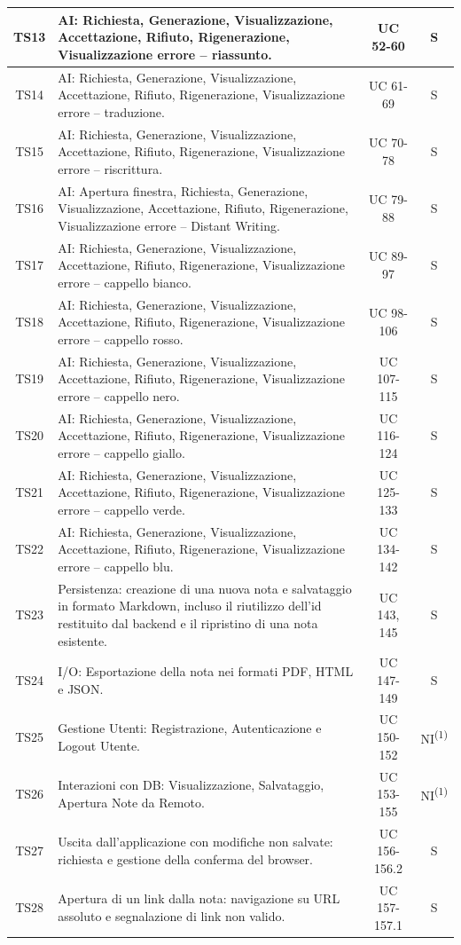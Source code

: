 \begin{xltabular}{\textwidth}{|c|X|c|c|}
    TS13 & AI: Richiesta, Generazione, Visualizzazione, Accettazione, Rifiuto, Rigenerazione, Visualizzazione errore -- riassunto. & UC 52-60 & S \\ \hline
    TS14 & AI: Richiesta, Generazione, Visualizzazione, Accettazione, Rifiuto, Rigenerazione, Visualizzazione errore -- traduzione. & UC 61-69 & S \\ \hline
    TS15 & AI: Richiesta, Generazione, Visualizzazione, Accettazione, Rifiuto, Rigenerazione, Visualizzazione errore -- riscrittura. & UC 70-78 & S \\ \hline
    TS16 & AI: Apertura finestra, Richiesta, Generazione, Visualizzazione, Accettazione, Rifiuto, Rigenerazione, Visualizzazione errore -- Distant Writing. & UC 79-88 & S \\ \hline
    TS17 & AI: Richiesta, Generazione, Visualizzazione, Accettazione, Rifiuto, Rigenerazione, Visualizzazione errore -- cappello bianco. & UC 89-97 & S \\ \hline
    TS18 & AI: Richiesta, Generazione, Visualizzazione, Accettazione, Rifiuto, Rigenerazione, Visualizzazione errore -- cappello rosso. & UC 98-106 & S \\ \hline
    TS19 & AI: Richiesta, Generazione, Visualizzazione, Accettazione, Rifiuto, Rigenerazione, Visualizzazione errore -- cappello nero. & UC 107-115 & S \\ \hline
    TS20 & AI: Richiesta, Generazione, Visualizzazione, Accettazione, Rifiuto, Rigenerazione, Visualizzazione errore -- cappello giallo. & UC 116-124 & S \\ \hline
    TS21 & AI: Richiesta, Generazione, Visualizzazione, Accettazione, Rifiuto, Rigenerazione, Visualizzazione errore -- cappello verde. & UC 125-133 & S \\ \hline
    TS22 & AI: Richiesta, Generazione, Visualizzazione, Accettazione, Rifiuto, Rigenerazione, Visualizzazione errore -- cappello blu. & UC 134-142 & S \\ \hline

    TS23 & Persistenza: creazione di una nuova nota e salvataggio in formato Markdown, incluso il riutilizzo dell'id restituito dal backend e il ripristino di una nota esistente. & UC 143, 145 & S \\ \hline
    TS24 & I/O: Esportazione della nota nei formati PDF, HTML e JSON. & UC 147-149 & S \\ \hline
    TS25 & Gestione Utenti: Registrazione, Autenticazione e Logout Utente. & UC 150-152 & NI\textsuperscript{(1)} \\ \hline
    TS26 & Interazioni con DB: Visualizzazione, Salvataggio, Apertura Note da Remoto. & UC 153-155 & NI\textsuperscript{(1)} \\ \hline
    TS27 & Uscita dall'applicazione con modifiche non salvate: richiesta e gestione della conferma del browser. & UC 156-156.2 & S \\ \hline
    TS28 & Apertura di un link dalla nota: navigazione su URL assoluto e segnalazione di link non valido. & UC 157-157.1 & S \\ \hline

\end{xltabular}


